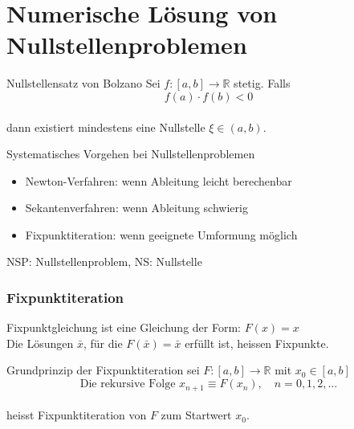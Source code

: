 \section{Numerische Lösung von Nullstellenproblemen}

\begin{lemma}{Nullstellensatz von Bolzano}
Sei $f:[a,b] \rightarrow \mathbb{R}$ stetig. Falls 
\vspace{-1mm}\\
$$f(a) \cdot f(b) < 0$$ 
\vspace{-3mm}\\
dann existiert mindestens eine Nullstelle $\xi \in (a,b)$.
\end{lemma}

\begin{KR}{Systematisches Vorgehen bei Nullstellenproblemen}
    \begin{itemize}
        \item Newton-Verfahren: wenn Ableitung leicht berechenbar
        \item Sekantenverfahren: wenn Ableitung schwierig
        \item Fixpunktiteration: wenn geeignete Umformung möglich
    \end{itemize}
\end{KR}

\begin{remark}
    NSP: Nullstellenproblem, NS: Nullstelle
\end{remark}



\subsubsection{Fixpunktiteration}

\begin{definition}{Fixpunktgleichung}
ist eine Gleichung der Form: $F(x)=x$\\
Die Lösungen $\bar{x}$, für die $F(\bar{x})=\bar{x}$ erfüllt ist, heissen Fixpunkte.
\end{definition}

\begin{concept}{Grundprinzip der Fixpunktiteration}
sei $F:[a,b] \rightarrow \mathbb{R}$ mit $x_0 \in [a,b]$ 
\vspace{-6mm}\\
$$\text{Die rekursive Folge }x_{n+1} \equiv F(x_n), \quad n=0,1,2,\ldots$$
\vspace{-4mm}\\
heisst Fixpunktiteration von $F$ zum Startwert $x_0$.
\end{concept}

